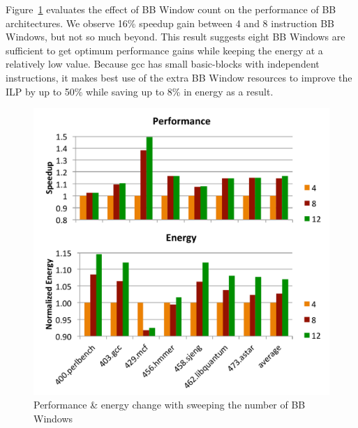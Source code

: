 Figure~\ref{fig:bbWin_ins_cnt} evaluates the effect of BB Window count on the
performance of BB architectures. We observe 16\% speedup gain between 4 and 8
instruction BB Windows, but not so much beyond. This result suggests  eight BB
Windows are sufficient to get optimum performance gains while keeping the energy
at a relatively low value. Because gcc has small basic-blocks with independent
instructions, it makes best use of the extra BB Window resources to improve the
ILP by up to 50\% while saving up to 8\% in energy as a result.
\begin{figure}[!htbp]
	\centering
	\includegraphics[width=1.0\columnwidth]{result/bbWin_ins_cnt.pdf} 
    \caption{Performance \& energy change with sweeping the number of BB Windows}
	\label{fig:bbWin_ins_cnt}
\end{figure}

